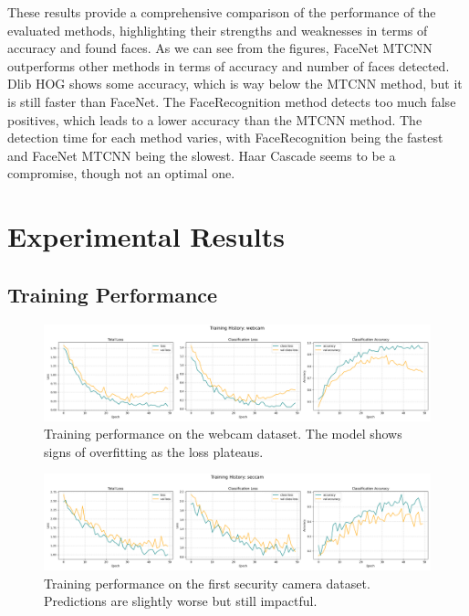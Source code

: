 These results provide a comprehensive comparison of the performance of the evaluated methods, highlighting their strengths and weaknesses in terms of accuracy and found faces.
As we can see from the figures, FaceNet MTCNN outperforms other methods in terms of accuracy and number of faces detected. Dlib HOG shows some accuracy, which is way below the MTCNN method, but it is still faster than FaceNet. The FaceRecognition method detects too much false positives, which leads to a lower accuracy than the MTCNN method. The detection time for each method varies, with FaceRecognition being the fastest and FaceNet MTCNN being the slowest. Haar Cascade seems to be a compromise, though not an optimal one.
\section{Experimental Results}

\subsection{Training Performance}

\begin{figure}[ht!]
    \centering
    \includegraphics[width=\textwidth]{../Files/training_webcam.png}
    \caption{Training performance on the webcam dataset. The model shows signs of overfitting as the loss plateaus.}
    \label{fig:training-webcam}
\end{figure}

\begin{figure}[ht!]
    \centering
    \includegraphics[width=\textwidth]{../Files/training_seccam.png}
    \caption{Training performance on the first security camera dataset. Predictions are slightly worse but still impactful.}
    \label{fig:training-seccam}
\end{figure}

